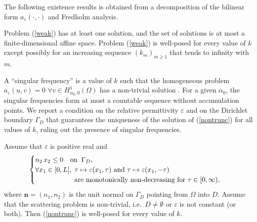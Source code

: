 \documentclass[a4paper,10pt]{article}
\newcommand{\bn}{{\mathbf n}}
\newcommand{\GD}{{\Gamma_D}}
\begin{document}
The following existence results is obtained from a decomposition of the bilinear form $a_\varepsilon(\cdot, \cdot)$ \cite[Lemma 3.1]{BonnetBD1994} and Fredholm analysis.
\begin{thm}
Problem (\ref{weak}) has at least one solution, and the set of solutions is at most a finite-dimensional affine space. Problem (\ref{weak}) is well-posed for every value of $k$ except possibly for an increasing sequence $(k_m)_{m \geq 1}$	that tends to infinity with~$m$. 
\end{thm}

A ``singular frequency'' is a value of $k$ such that the homogeneous problem $a_\varepsilon(u,v)=0$ $\forall v \in H^1_{\alpha_0, 0}(\Omega)$ has a non-trivial solution {\cite[\S3.4]{BonnetBD1994}}. 
For a given $\alpha_0$, the singular frequencies form at most a countable sequence without accumulation points.
We report a condition on the relative permittivity $\varepsilon$ and on the Dirichlet boundary $\GD$ that guarantees the uniqueness of the solution of (\ref{nontrunc}) for all values of $k${, ruling out the presence of singular frequencies}.
\begin{thm} \label{wellposed} 
Assume that $\varepsilon$ is positive real and
\begin{equation}\label{eq:NonTrap}
	\begin{cases}
		n_2 \, x_2 \leq 0 \quad\text{on} \hspace{0.2cm} \GD, \\
		\forall x_1\in[0,L], \; \tau\mapsto\varepsilon(x_1,\tau)\text{ and }
		\tau\mapsto\varepsilon(x_1,-\tau)\\
		\hspace{20mm}\text{are monotonically non-decreasing for }\tau\in[0,\infty),
	\end{cases}
\end{equation}
where $\bn = (n_1, n_2)$ is the unit normal on $\GD$ pointing from $\Omega$ into $D$.
Assume that the scattering problem is non-trivial, i.e.\ $D\ne\emptyset$ or $\varepsilon$ is not constant (or both).
Then (\ref{nontrunc}) is well-posed for every value of $k$.
\end{thm}
\end{document}

